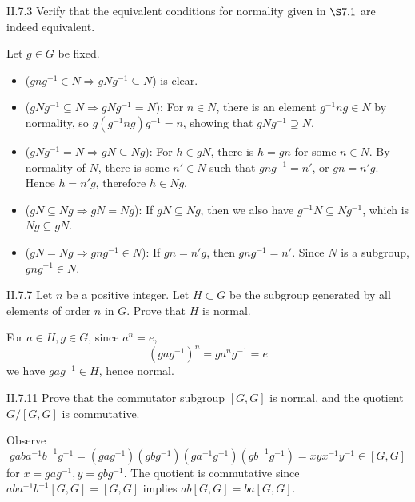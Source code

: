 \begin{problem}{II.7.3}
Verify that the equivalent conditions for normality given in $\S 7.1$ are indeed equivalent.
\end{problem}
\begin{pf}
Let $g \in G$ be fixed.
\begin{itemize}
    \setlength\itemsep{0pt}
    \item ($gng^{-1} \in N \Rightarrow gNg^{-1} \subseteq N$) is clear.
    \item ($gNg^{-1} \subseteq N \Rightarrow gNg^{-1} = N$): For $n \in N$, there is an element $g^{-1}ng \in N$ by normality, so $g(g^{-1}ng)g^{-1} = n$, showing that $gNg^{-1} \supseteq N$.
    \item ($gNg^{-1} = N \Rightarrow gN \subseteq Ng$): For $h \in gN$, there is $h = gn$ for some $n \in N$. By normality of $N$, there is some $n' \in N$ such that $gng^{-1} = n'$, or $gn = n'g$. Hence $h = n'g$, therefore $h \in Ng$.
    \item ($gN \subseteq Ng \Rightarrow gN = Ng$): If $gN \subseteq Ng$, then we also have $g^{-1}N \subseteq Ng^{-1}$, which is $Ng \subseteq gN$.
    \item ($gN = Ng \Rightarrow gng^{-1} \in N$): If $gn = n'g$, then $gng^{-1} = n'$. Since $N$ is a subgroup, $gng^{-1} \in N$. 
\end{itemize}
\end{pf}

\begin{problem}{II.7.7}
Let $n$ be a positive integer. Let $H \subset G$ be the subgroup generated by all elements of order $n$ in $G$. Prove that $H$ is normal.
\end{problem}
\begin{pf}
For $a \in H, g \in G$, since $a^n = e$,
\[
(gag^{-1})^n = ga^ng^{-1} = e
\]
we have $gag^{-1} \in H$, hence normal.
\end{pf}

\begin{problem}{II.7.11}
Prove that the commutator subgroup $[G,G]$ is normal, and the quotient $G/[G,G]$ is commutative.
\end{problem}
\begin{pf}
Observe
\[
gaba^{-1}b^{-1}g^{-1} = (gag^{-1})(gbg^{-1})(ga^{-1}g^{-1})(gb^{-1}g^{-1}) = xyx^{-1}y^{-1} \in [G,G]
\]
for $x = gag^{-1}, y = gbg^{-1}$. The quotient is commutative since $aba^{-1}b^{-1}[G,G] = [G,G]$ implies $ab[G,G] = ba[G,G]$.
\end{pf}

